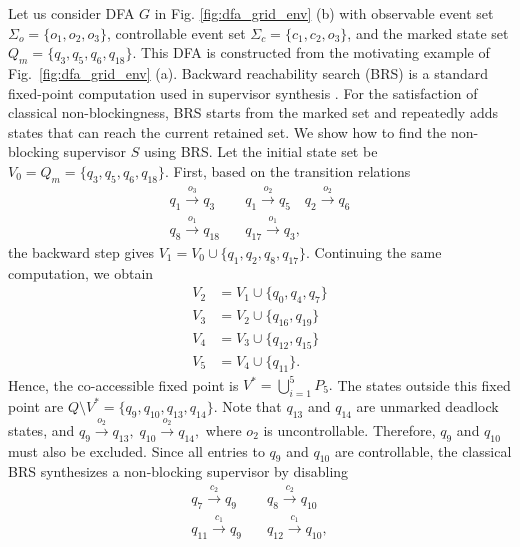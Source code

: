 \documentclass[journal,twoside,web]{ieeecolor}
\begin{document}
\begin{example}\label{ex:nb:1}
Let us consider DFA $G$ in Fig. \ref{fig:dfa_grid_env} (b) with observable event set $\Sigma_o = \{o_1, o_2, o_3\}$, controllable event set $\Sigma_c = \{ c_1, c_2, o_3 \}$, and the marked state set
$Q_m = \{ q_3, q_5, q_6, q_{18} \}$.
This DFA is constructed from the motivating example of Fig.~\ref{fig:dfa_grid_env} (a). 
Backward reachability search (BRS) is a standard fixed-point computation used in supervisor synthesis \cite{thuijsman2020transformational, thuijsman2024reducing}.
For the satisfaction of classical non-blockingness, BRS starts from the marked set and repeatedly adds states that can reach the current retained set.
%
We show how to find the non-blocking supervisor $S$ using BRS.
Let the initial state set be
$
    V_0 = Q_m =\{ q_3, q_5, q_6, q_{18} \}.
$
First, based on the transition relations
$$
\begin{aligned}
    q_1\xrightarrow{o_3}q_3    &\quad q_1\xrightarrow{o_2}q_5 \quad
    q_2\xrightarrow{o_2}q_6    \\
    q_8\xrightarrow{o_1}q_{18} &\quad q_{17}\xrightarrow{o_1}q_3,
\end{aligned}
$$
the backward step gives
$
    V_1 = V_0 \cup \{ q_1, q_2, q_8, q_{17} \}.
$
Continuing the same computation, we obtain
$$
\begin{aligned}
    V_2 &= V_1 \cup \{q_0,q_4,q_7\}   \\
    V_3 &= V_2 \cup \{q_{16},q_{19}\} \\
    V_4 &= V_3 \cup \{q_{12},q_{15}\} \\
    V_5 &= V_4 \cup \{q_{11}\}.
\end{aligned}
$$
Hence, the co-accessible fixed point is
$
    V^* = \bigcup_{i = 1}^5 P_5.
$
The states outside this fixed point are
$
    Q \setminus V^* = \{ q_9, q_{10}, q_{13}, q_{14} \}.
$
Note that $q_{13}$ and $q_{14}$ are unmarked deadlock states, and
$
    q_9\xrightarrow{o_2}q_{13}, \;
    q_{10}\xrightarrow{o_2}q_{14},
$
where $o_2$ is uncontrollable. 
Therefore, $q_9$ and $q_{10}$ must also be excluded.
%
Since all entries to $q_9$ and $q_{10}$ are controllable, the classical BRS
synthesizes a non-blocking supervisor by disabling
$$
\begin{aligned}
    q_7\xrightarrow{c_2}q_9     &\quad q_8\xrightarrow{c_2}q_{10} \\
    q_{11}\xrightarrow{c_1}q_9  &\quad q_{12}\xrightarrow{c_1}q_{10},

\end{aligned}$$
\end{example}
\end{document}

